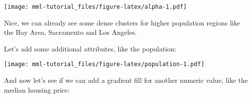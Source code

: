 \documentclass[]{book}
\newenvironment{Shaded}{\begin{snugshade}}{\end{snugshade}}
\newcommand{\KeywordTok}[1]{\textcolor[rgb]{0.13,0.29,0.53}{\textbf{#1}}}
\newcommand{\DataTypeTok}[1]{\textcolor[rgb]{0.13,0.29,0.53}{#1}}
\newcommand{\FloatTok}[1]{\textcolor[rgb]{0.00,0.00,0.81}{#1}}
\newcommand{\StringTok}[1]{\textcolor[rgb]{0.31,0.60,0.02}{#1}}
\newcommand{\OperatorTok}[1]{\textcolor[rgb]{0.81,0.36,0.00}{\textbf{#1}}}
\newcommand{\NormalTok}[1]{#1}
\theoremstyle{definition}
\theoremstyle{definition}
\theoremstyle{definition}
\theoremstyle{remark}
\begin{document}
\begin{Shaded}
\end{Shaded}

\texttt{[image: mml-tutorial\_files/figure-latex/alpha-1.pdf]}

Nice, we can already see some dense clusters for higher population
regions like the Bay Area, Sacramento and Los Angeles.

Let's add some additional attributes, like the population:

\begin{Shaded}
\end{Shaded}

\texttt{[image: mml-tutorial\_files/figure-latex/population-1.pdf]}

And now let's see if we can add a gradient fill for another numeric
value, like the median housing price:

\begin{Shaded}
\end{Shaded}
\end{document}

